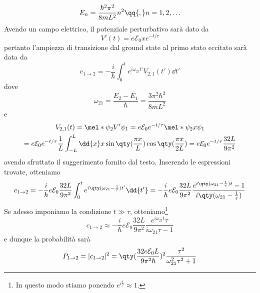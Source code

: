 \begin{soluzione}
   \begin{equation*}
      E_n
      =\frac{\hbar^2 \pi^2}{8 m L^2} n^2
      \qq{,}
      n=1,2,\ldots
   \end{equation*}
   Avendo un campo elettrico, il potenziale perturbativo sarà dato da
   \begin{equation*}
      V'(t)
      =e \mathcal{E}_0 x e^{-t/\tau}
   \end{equation*}
   pertanto l'ampiezza di transizione dal ground state al primo stato eccitato sarà data da
   \begin{equation*}
      c_{1 \to 2}
      =-\frac{i}{\hbar} \int_{0}^{t} e^{i \omega_{21} t'} V_{2,1}(t') \dd{t'}
   \end{equation*}
   dove
   \begin{equation*}
      \omega_{21}
      =\frac{E_2 - E_1}{\hbar}
      =\frac{3 \pi^2 \hbar^2}{8 m L^2}
   \end{equation*}
   e
   \begin{gather*}
      V_{2,1}(t)
      =\mel*{\psi_2}{V'}{\psi_1}
      =e \mathcal{E}_0 e^{-t/\tau} \mel*{\psi_2}{x}{\psi_1}
      \\
      =e \mathcal{E}_0 e^{-t/\tau} \frac{1}{L} \int_{-L}^{L} \dd{x} x \sin{ \qty( \frac{\pi x}{L} ) } \cos{ \qty( \frac{\pi x}{2L} ) }
      =e \mathcal{E}_0 e^{-t/\tau} \frac{32 L}{9 \pi^2}
   \end{gather*}
   avendo sfruttato il suggerimento fornito dal testo. Inserendo le espressioni trovate, otteniamo
   \begin{equation*}
      c_{1 \to 2}
      =-\frac{i}{\hbar} e \mathcal{E}_0 \frac{32 L}{9 \pi^2} \int_{0}^{t} e^{i \qty( \omega_{21} - \frac{1}{\tau}) t'} \dd{t'}
      =-\frac{i}{\hbar} e \mathcal{E}_0 \frac{32 L}{9 \pi^2} \frac{e^{i \qty( \omega_{21} - \frac{1}{\tau}) t} - 1}{i \qty( \omega_{21} - \frac{1}{\tau})}
   \end{equation*}
   Se adesso imponiamo la condizione $t \gg \tau$, otteniamo\footnote{In questo modo stiamo ponendo $e^{i \frac{t}{\tau}}\approx 1$.}
   \begin{equation*}
      c_{1 \to 2}
      \approx -\frac{i}{\hbar} e \mathcal{E}_0 \frac{32 L}{9 \pi^2} \frac{e^{i \omega_{21} t} \tau}{i \omega_{21} \tau - 1}
   \end{equation*}
   e dunque la probabilità sarà
   \begin{equation*}
      P_{1 \to 2}
      =|c_{1 \to 2}|^2
      =\qty( \frac{32 e \mathcal{E}_0 L}{9 \pi^2 \hbar} )^2 \frac{\tau^2}{\omega_{21}^2 \tau^2 + 1}
   \end{equation*}

\end{soluzione}
